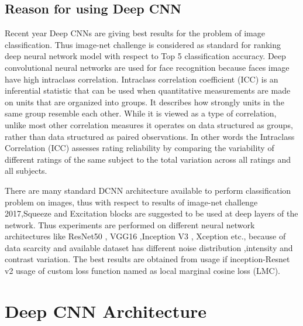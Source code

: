 \documentclass[a4paper,12pt, twoside]{NITKReport}
\begin{document}
\subsection{Reason for using Deep CNN}
\par Recent year Deep CNNs are giving best results for the problem of image classification. Thus image-net challenge is considered as standard for ranking deep neural network model with respect to Top 5 classification accuracy. \cite{NIPS2012_4824} Deep convolutional neural networks are used for face recognition because faces image have high intraclass correlation. Intraclass correlation coefficient (ICC) \cite{koch1982intraclass} is an inferential statistic that can be used when quantitative measurements are made on units that are organized into groups. It describes how strongly units in the same group resemble each other. While it is viewed as a type of correlation, unlike most other correlation measures it operates on data structured as groups, rather than data structured as paired observations. In other words the Intraclass Correlation (ICC) assesses rating reliability by comparing the variability of different ratings of the same subject to the total variation across all ratings and all subjects.
\par There are many standard DCNN architecture available to perform classification problem on images, thus with respect to results of image-net challenge 2017,Squeeze and Excitation blocks are suggested to be used at deep layers of the network. Thus experiments are performed on different neural network architectures like ResNet50 \cite{he2016deep}, VGG16 \cite{DBLP:journals/corr/SimonyanZ14a},Inception V3 \cite{DBLP:journals/corr/SzegedyVISW15}, Xception \cite{DBLP:journals/corr/Chollet16a} etc., because of data scarcity and available dataset has different noise distribution ,intensity and contrast variation. The best results are obtained from usage if inception-Resnet v2 \cite{DBLP:journals/corr/SzegedyIV16} usage of custom loss function named as local marginal cosine loss (LMC).

\section{Deep CNN Architecture}
\end{document}
